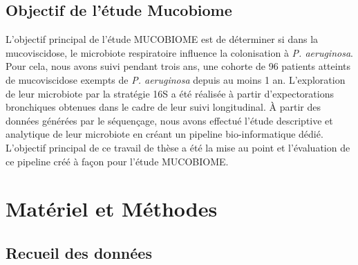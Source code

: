 \documentclass[12pt,a4paper]{article}
\begin{document}
\subsection{Objectif de l'étude Mucobiome}
L'objectif principal de l'étude MUCOBIOME est de déterminer si dans la mucoviscidose, le microbiote respiratoire influence la colonisation à \textit{P. aeruginosa}.
Pour cela, nous avons suivi pendant trois ans,  une cohorte de 96 patients atteints de mucoviscidose exempts de \textit{P. aeruginosa} depuis au moins 1 an.
L'exploration de leur microbiote par la stratégie 16S a été réalisée à partir d'expectorations bronchiques obtenues dans le cadre de leur suivi longitudinal.
À partir des données générées par le séquençage, nous avons effectué l'étude descriptive et analytique de leur microbiote en créant un pipeline bio-informatique dédié. L'objectif principal de ce travail de thèse a été la mise au point et l'évaluation de ce pipeline créé à façon pour l'étude MUCOBIOME.

\section{Matériel et Méthodes}
\subsection{Recueil des données}
\end{document}
